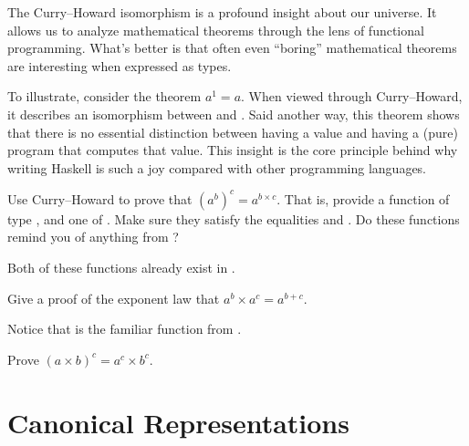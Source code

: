 \documentclass[book.tex]{subfiles}
\begin{document}
The Curry--Howard isomorphism is a profound insight about our universe. It
allows us to analyze mathematical theorems through the lens of functional
programming. What's better is that often even ``boring'' mathematical theorems
are interesting when expressed as types.

To illustrate, consider the theorem $a^1 = a$. When viewed through
Curry--Howard, it describes an isomorphism between  and .
Said another way, this theorem shows that there is no essential distinction
between having a value and having a (pure) program that computes that value.
This insight is the core principle behind why writing Haskell is such a joy
compared with other programming languages.

\begin{exercise}
  Use Curry--Howard to prove that $(a^b)^c = a^{b\times c}$. That is, provide a
  function of type , and one of . Make sure they satisfy the equalities 
  and . Do these functions remind you of anything from
  ?
\end{exercise}
\begin{solution}

  Both of these functions already exist in .
\end{solution}

\begin{exercise}
Give a proof of the exponent law that $a^b \times a^c = a^{b+c}$.
\end{exercise}
\begin{solution}

  Notice that  is the familiar  function from .
\end{solution}

\begin{exercise}
Prove $(a\times b)^c = a^c \times b^c$.
\end{exercise}
\begin{solution}
\end{solution}


\section{Canonical Representations}
\end{document}
